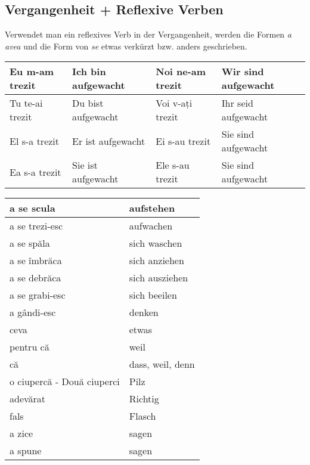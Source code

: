\documentclass[11pt, oneside]{article}
\begin{document}
\subsection{Vergangenheit + Reflexive Verben}
Verwendet man ein reflexives Verb in der Vergangenheit, werden die Formen 
\emph{a avea} und die Form von \emph{se} etwas verkürzt bzw. anders 
geschrieben.
%
\begin{center}
  \begin{tabular}{ |p{3.25cm}|p{3.25cm}||p{3.25cm}|p{3.25cm}|  }
      \hline
      Eu m-am trezit & Ich bin aufgewacht & Noi ne-am trezit & Wir sind aufgewacht\\
      \hline
      Tu te-ai trezit & Du bist aufgewacht & Voi v-ați trezit & Ihr seid aufgewacht\\
      \hline
      El s-a trezit & Er ist aufgewacht & Ei s-au trezit & Sie sind aufgewacht\\ 
      Ea s-a trezit & Sie ist aufgewacht & Ele s-au trezit & Sie sind aufgewacht\\
      \hline
     \end{tabular}
\end{center}

\begin{center}
  \begin{tabular}{ | p{6cm}| p{6cm} | } 
    \hline
    a se scula & aufstehen\\
    \hline
    a se trezi-esc & aufwachen\\
    \hline
    a se spăla & sich waschen\\
    \hline
    a se îmbrăca & sich anziehen\\
    \hline
    a se debrăca & sich ausziehen\\
    \hline
    a se grabi-esc & sich beeilen\\
    \hline
    a gândi-esc & denken\\
    \hline
    ceva & etwas\\
    \hline
    pentru că & weil\\
    \hline
    că & dass, weil, denn\\
    \hline
    o ciupercă - Două ciuperci & Pilz\\
    \hline
    adevărat & Richtig\\
    \hline
    fals & Flasch\\
    \hline
    a zice & sagen\\
    \hline
    a spune & sagen\\
    \hline
  \end{tabular}
\end{center}
\end{document}
